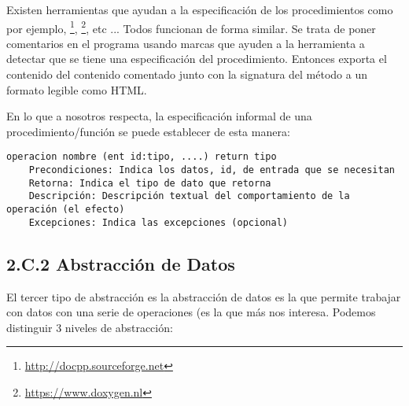 Existen herramientas que ayudan a la especificación de los procedimientos como por ejemplo, \footnote{\url{http://docpp.sourceforge.net}}, \footnote{\url{https://www.doxygen.nl}}, etc ... Todos funcionan de forma similar. Se trata de poner comentarios en el programa usando marcas que ayuden a la herramienta a detectar que se tiene una especificación del procedimiento. Entonces exporta el contenido del contenido comentado junto con la signatura del método a un formato legible como HTML.

En lo que a nosotros respecta, la especificación informal de una procedimiento/función se puede establecer de esta manera:

\begin{Verbatim}[frame=single]
operacion nombre (ent id:tipo, ....) return tipo
    Precondiciones: Indica los datos, id, de entrada que se necesitan
    Retorna: Indica el tipo de dato que retorna
    Descripción: Descripción textual del comportamiento de la operación (el efecto)
    Excepciones: Indica las excepciones (opcional)
\end{Verbatim}





\subsection*{2.C.2 Abstracción de Datos}
 



El tercer tipo de abstracción es la abstracción de datos es la que permite trabajar con datos con una serie de operaciones  (es la que más nos interesa. Podemos distinguir 3 niveles de abstracción:

